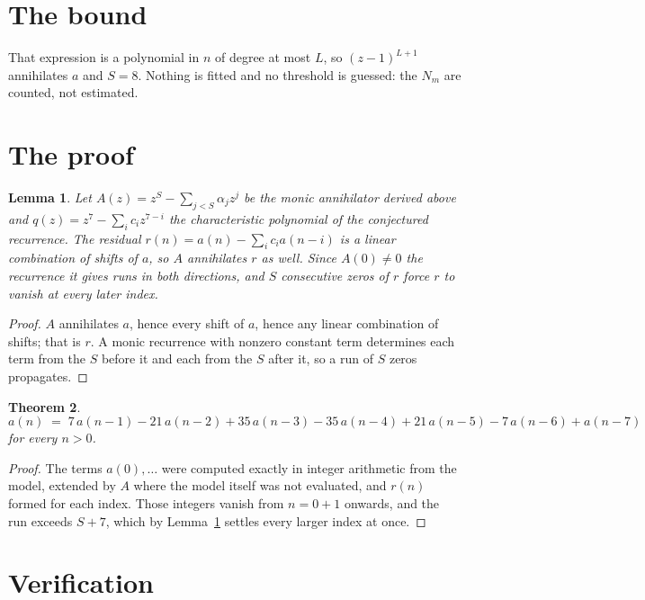 \documentclass[11pt,a4paper]{article}
\theoremstyle{plain}
\newtheorem{theorem}{Theorem}
\newtheorem{lemma}[theorem]{Lemma}
\theoremstyle{definition}
\begin{document}
\section{The bound}

That expression is a polynomial in $n$ of degree at most $L$, so $(z-1)^{L+1}$ annihilates
$a$ and $S=8$. Nothing is fitted and no threshold is guessed: the $N_m$ are counted, not
estimated.

\section{The proof}

\begin{lemma}\label{lem:crit}
Let $A(z)=z^S-\sum_{j<S}\alpha_jz^{j}$ be the monic annihilator derived above and
$q(z)=z^{7}-\sum_ic_iz^{7-i}$ the characteristic polynomial of the conjectured
recurrence. The residual $r(n)=a(n)-\sum_ic_ia(n-i)$ is a linear combination of shifts of $a$,
so $A$ annihilates $r$ as well. Since $A(0)\ne0$ the recurrence it gives runs in both
directions, and $S$ consecutive zeros of $r$ force $r$ to vanish at every later index.
\end{lemma}

\begin{proof}
$A$ annihilates $a$, hence every shift of $a$, hence any linear combination of shifts; that is
$r$. A monic recurrence with nonzero constant term determines each term from the $S$ before it
and each from the $S$ after it, so a run of $S$ zeros propagates.
\end{proof}

\begin{theorem}
\[
a(n)\;=\;7\,a(n-1) - 21\,a(n-2) + 35\,a(n-3) - 35\,a(n-4) + 21\,a(n-5) - 7\,a(n-6) + a(n-7)
\]
for every $n>0$.
\end{theorem}

\begin{proof}
The terms $a(0),\dots$ were computed exactly in integer arithmetic from the model, extended by
$A$ where the model itself was not evaluated, and $r(n)$ formed for each index. Those integers
vanish from $n=0+1$ onwards, and the run exceeds $S+7$, which by
Lemma~\ref{lem:crit} settles every larger index at once.
\end{proof}

\section{Verification}
\end{document}
